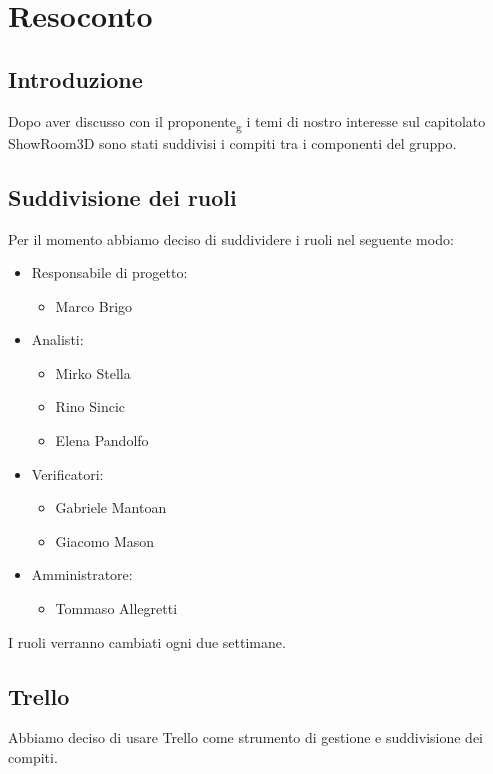 \section{Resoconto}
\subsection{Introduzione}
Dopo aver discusso con il proponente\textsubscript{g} i temi di nostro interesse sul capitolato ShowRoom3D 
sono stati suddivisi i compiti tra i componenti del gruppo.
\subsection{Suddivisione dei ruoli}
Per il momento abbiamo deciso di suddividere i ruoli nel seguente modo:
\begin{itemize}
    \item Responsabile di progetto:
    \begin{itemize}
        \item Marco Brigo
    \end{itemize}
    \item Analisti:
    \begin{itemize}
        \item Mirko Stella
        \item Rino Sincic
        \item Elena Pandolfo
    \end{itemize}
    \item Verificatori:
    \begin{itemize}
        \item Gabriele Mantoan
        \item Giacomo Mason
    \end{itemize}
    \item Amministratore:
    \begin{itemize}
        \item Tommaso Allegretti
    \end{itemize}
\end{itemize}
I ruoli verranno cambiati ogni due settimane.

\subsection{Trello}
Abbiamo deciso di usare Trello come strumento di gestione e suddivisione dei compiti.


